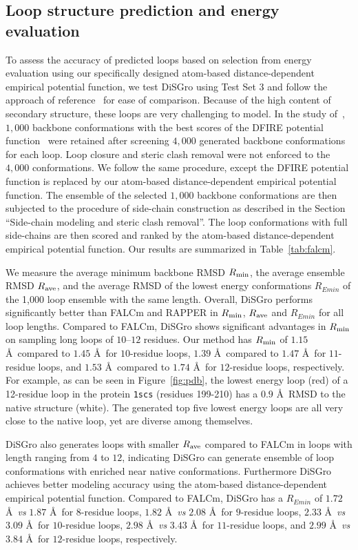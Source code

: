 \subsection*{Loop structure prediction and energy evaluation}
To assess the accuracy of predicted loops based on selection from
energy evaluation using our specifically designed atom-based
distance-dependent empirical potential function, we test {\sc
DiSGro} using Test Set 3 and follow the approach of
reference~\cite{lee2010} for ease of comparison. Because of the high
content of secondary structure, these loops are very challenging to
model. In the study of~\cite{lee2010}, $1,000$ backbone
conformations with the best scores of the DFIRE potential
function~\cite{zhou2002} were retained after screening $4,000$
generated backbone conformations for each loop. Loop closure and
steric clash removal were not enforced to the $4,000$ conformations.
We follow the same procedure, except the DFIRE potential function is
replaced by our atom-based distance-dependent empirical potential
function. The ensemble of the selected $1,000$ backbone
conformations are then subjected to the procedure of side-chain
construction as described in the Section ``Side-chain modeling and
steric clash removal''. The loop conformations with full side-chains
are then scored and ranked by the atom-based distance-dependent
empirical potential function. Our results are summarized in
Table~\ref{tab:falcm}.

We measure the average minimum backbone RMSD $R_{\rm min}$, the
average ensemble RMSD $R_{\rm ave}$, and the average RMSD of the
lowest energy conformations $R_{Emin}$ of the 1,000 loop ensemble
with the same length. Overall, {\sc DiSGro} performs significantly
better than FALCm and RAPPER in $R_{\rm min}$, $R_{\rm ave}$ and
$R_{Emin}$ for all loop lengths. Compared to FALCm, {\sc DiSGro}
shows significant advantages in $R_{\rm min}$ on sampling long loops
of $10$--$12$ residues. Our method has $R_{\rm min}$ of $1.15$
\r{A}\ compared to $1.45$ \r{A}\ for $10$-residue loops, $1.39$
\r{A}\ compared to $1.47$ \r{A}\ for $11$-residue loops, and $1.53$
\r{A}\ compared to $1.74$ \r{A}\ for $12$-residue loops,
respectively. For example, as can be seen in Figure~\ref{fig:pdb},
the lowest energy loop (red) of a 12-residue loop in the protein
{\tt 1scs} (residues 199-210) has a $0.9$ \r{A}\ RMSD to the native
structure (white). The generated top five lowest energy loops are
all very close to the native loop, yet are diverse among themselves.

{\sc DiSGro} also generates loops with smaller $R_{\rm ave}$
compared to FALCm in loops with length ranging from $4$ to $12$,
indicating {\sc DiSGro} can generate ensemble of loop conformations
with enriched near native conformations. Furthermore {\sc DiSGro}
achieves better modeling accuracy using the atom-based
distance-dependent empirical potential function. Compared to FALCm,
{\sc DiSGro} has a $R_{Emin}$ of $1.72$ \r{A}\ {\it vs}\/ $1.87$
\r{A}\ for $8$-residue loops, $1.82$ \r{A}\ {\it vs}\/ $2.08$ \r{A}\
for $9$-residue loops, $2.33$ \r{A}\ {\it vs}\/ $3.09$ \r{A}\ for
$10$-residue loops, $2.98$ \r{A}\ {\it vs}\/ $3.43$ \r{A}\ for
$11$-residue loops, and $2.99$ \r{A}\ {\it vs}\/ $3.84$ \r{A}\ for
$12$-residue loops, respectively.

